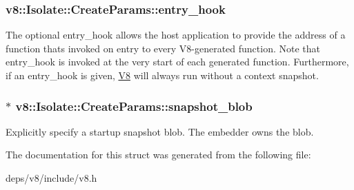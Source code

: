\subsubsection[{entry\+\_\+hook}]{ v8\+::\+Isolate\+::\+Create\+Params\+::entry\+\_\+hook}\label{structv8_1_1_isolate_1_1_create_params_aa7aa18bbe2d86713e5b074a93b38dc60}
The optional entry\+\_\+hook allows the host application to provide the address of a function that\textquotesingle{}s invoked on entry to every V8-\/generated function. Note that entry\+\_\+hook is invoked at the very start of each generated function. Furthermore, if an entry\+\_\+hook is given, \hyperlink{classv8_1_1_v8}{V8} will always run without a context snapshot. \hypertarget{structv8_1_1_isolate_1_1_create_params_a25d38476e4dec79ae96c59292eee4a64}{}
\subsubsection[{snapshot\+\_\+blob}]{$\ast$ v8\+::\+Isolate\+::\+Create\+Params\+::snapshot\+\_\+blob}\label{structv8_1_1_isolate_1_1_create_params_a25d38476e4dec79ae96c59292eee4a64}
Explicitly specify a startup snapshot blob. The embedder owns the blob. 

The documentation for this struct was generated from the following file\+:\begin{DoxyCompactItemize}
\item 
deps/v8/include/v8.\+h\end{DoxyCompactItemize}
